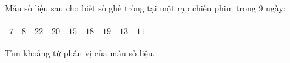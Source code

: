 \begin{ex}
Mẫu số liệu sau cho biết số ghế trống tại một rạp chiếu phim trong $9$ ngày:
\begin{center}
\begin{tabular}{|c|c|c|c|c|c|c|c|c|}\hline
$7$ & $8$ & $22$ & $20$ & $15$ & $18$ & $19$ & $13$ & $11$\\\hline
\end{tabular}
\end{center}
Tìm khoảng tứ phân vị của mẫu số liệu.
\end{ex}
